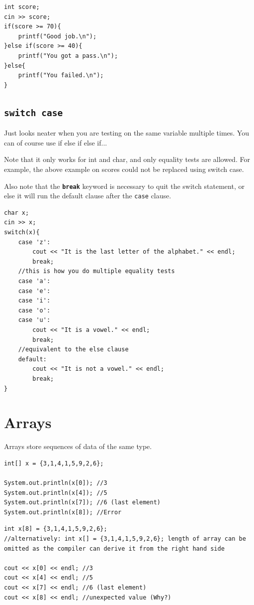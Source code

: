 \begin{lstlisting}
int score;
cin >> score;
if(score >= 70){
    printf("Good job.\n");
}else if(score >= 40){
    printf("You got a pass.\n");
}else{
    printf("You failed.\n");
}
\end{lstlisting}

\subsection{\texttt{switch case}}

Just looks neater when you are testing on the same variable multiple times. You can of course use if else if else if... 

Note that it only works for int and char, and only equality tests are allowed. For example, the above example on scores could not be replaced using switch case.

Also note that the \textbf{\texttt{break}} keyword is necessary to quit the switch statement, or else it will run the default clause after the \texttt{case} clause.

\begin{lstlisting}
char x;
cin >> x;
switch(x){
    case 'z':
        cout << "It is the last letter of the alphabet." << endl;
        break;
    //this is how you do multiple equality tests
    case 'a':
    case 'e':
    case 'i':
    case 'o':
    case 'u':
        cout << "It is a vowel." << endl;
        break;
    //equivalent to the else clause
    default:
        cout << "It is not a vowel." << endl;
        break;
}
\end{lstlisting}


\section{Arrays}
\label{sec:arrayintro}
Arrays store sequences of data of the same type.

\if{}
\begin{lstlisting}
int[] x = {3,1,4,1,5,9,2,6};

System.out.println(x[0]); //3 
System.out.println(x[4]); //5
System.out.println(x[7]); //6 (last element)
System.out.println(x[8]); //Error 
\end{lstlisting}
\else
\begin{lstlisting}
int x[8] = {3,1,4,1,5,9,2,6};
//alternatively: int x[] = {3,1,4,1,5,9,2,6}; length of array can be omitted as the compiler can derive it from the right hand side

cout << x[0] << endl; //3 
cout << x[4] << endl; //5
cout << x[7] << endl; //6 (last element)
cout << x[8] << endl; //unexpected value (Why?)
\end{lstlisting}
\fi

